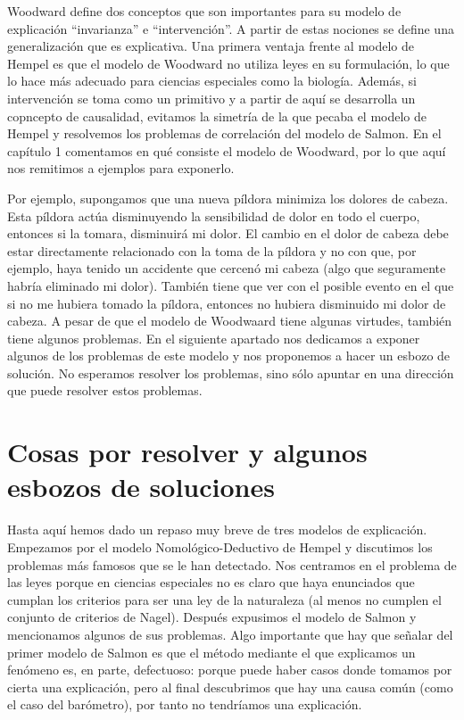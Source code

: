 Woodward define dos conceptos que son importantes para su modelo de explicación  ``invarianza'' e ``intervención''. A partir de estas nociones se define una generalización que es explicativa. Una primera ventaja frente al modelo de Hempel es que el modelo de Woodward no utiliza leyes en su formulación, lo que lo hace más adecuado para ciencias especiales como la biología. Además, si intervención se toma como un primitivo y a partir de aquí se desarrolla un copncepto de causalidad, evitamos la simetría de la que pecaba el modelo de Hempel y resolvemos los problemas de correlación del modelo de Salmon. En el capítulo 1 comentamos en qué consiste el modelo de Woodward, por lo que aquí nos remitimos a ejemplos para exponerlo.

Por ejemplo, supongamos que una nueva píldora minimiza los dolores de cabeza. Esta píldora actúa disminuyendo la sensibilidad de dolor en todo el cuerpo, entonces si la tomara, disminuirá mi dolor. El cambio en el dolor de cabeza debe estar directamente relacionado con la toma de la píldora y no con que, por ejemplo, haya tenido un accidente que cercenó mi cabeza (algo que seguramente habría eliminado mi dolor). También tiene que ver con el posible evento en el que si no me hubiera tomado la píldora, entonces no hubiera disminuido mi dolor de cabeza. A pesar de que el modelo de Woodwaard tiene algunas virtudes, también tiene algunos problemas. En el siguiente apartado nos dedicamos a exponer algunos de los problemas de este modelo y nos proponemos a hacer un esbozo de solución. No esperamos resolver los problemas, sino sólo apuntar en una dirección que puede resolver estos problemas.


\section{Cosas por resolver y algunos esbozos de soluciones}

\noindent Hasta aquí hemos dado un repaso muy breve de tres modelos de explicación. Empezamos por el modelo Nomológico-Deductivo de Hempel y discutimos los problemas más famosos que se le han detectado. Nos centramos en el problema de las leyes porque en ciencias especiales no es claro que haya enunciados que cumplan los criterios para ser una ley de la naturaleza (al menos no cumplen el conjunto de criterios de Nagel). Después expusimos el modelo de Salmon y mencionamos algunos de sus problemas. Algo importante que hay que señalar del primer modelo de Salmon es que el método mediante el que explicamos un fenómeno es, en parte, defectuoso: porque puede haber casos donde tomamos por cierta una explicación, pero al final descubrimos que hay una causa común (como el caso del barómetro), por tanto no tendríamos una explicación.

